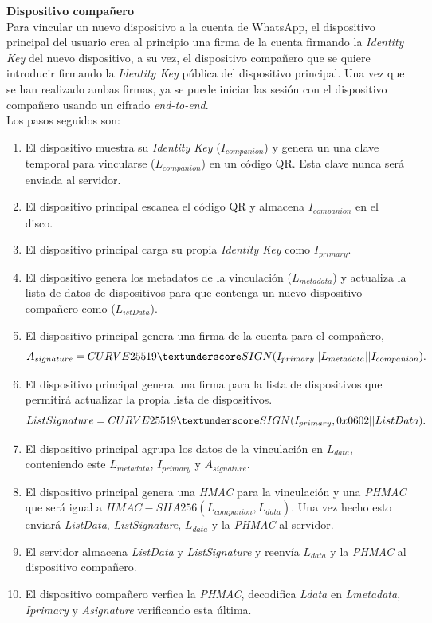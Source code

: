 \begin{description}
	\item \textbf{Dispositivo compañero}\\
	Para vincular un nuevo dispositivo a la cuenta de WhatsApp, el dispositivo principal del usuario crea al principio una firma de la cuenta firmando la \emph{Identity Key} del nuevo dispositivo, a su vez, el dispositivo compañero que se quiere introducir firmando la \emph{Identity Key} pública del dispositivo principal. Una vez que se han realizado ambas firmas, ya se puede iniciar las sesión con el dispositivo compañero usando un cifrado \emph{end-to-end}.\\Los pasos seguidos son:
	\begin{enumerate}
		\item El dispositivo muestra su \emph{Identity Key} ($I_{companion}$) y genera un una clave temporal para vincularse ($L_{companion}$) en un código QR. Esta clave nunca será enviada al servidor.
		\item El dispositivo principal escanea el código QR y almacena $I_{companion}$ en el disco.
		\item El dispositivo principal carga su propia \emph{Identity Key} como $I_{primary}$.
		\item El dispositivo genera los metadatos de la vinculación ($L_{metadata}$) y actualiza la lista de datos de dispositivos para que contenga un nuevo dispositivo compañero como ($L_{istData}$).
		\item El dispositivo principal genera una firma de la cuenta para el compañero, $$A_{signature}=CURVE25519\textunderscore SIGN(I_{primary} || L_{metadata} || I_{companion}).$$
		\item El dispositivo principal genera una firma para la lista de dispositivos que permitirá actualizar la propia lista de dispositivos. $$ListSignature = CURVE25519\textunderscore SIGN(I_{primary}, 0x0602 || ListData).$$
		\item El dispositivo principal agrupa los datos de la vinculación en $L_{data}$, conteniendo este $L_{metadata}$, $I_{primary}$ y $A_{signature}$.
		\item El dispositivo principal genera una \emph{HMAC} para la vinculación y una \emph{PHMAC} que será igual a $HMAC-SHA256(L_{companion}, L_{data})$. Una vez hecho esto enviará \emph{ListData}, \emph{ListSignature}, $L_{data}$ y la \emph{PHMAC} al servidor.
		\item El servidor almacena \emph{ListData} y \emph{ListSignature} y reenvía $L_{data}$ y la \emph{PHMAC} al dispositivo compañero.
		\item El dispositivo compañero  verfica la \emph{PHMAC}, decodifica \emph{Ldata} en \emph{Lmetadata}, \emph{Iprimary} y \emph{Asignature} verificando esta última.

\end{enumerate}
\end{description}
